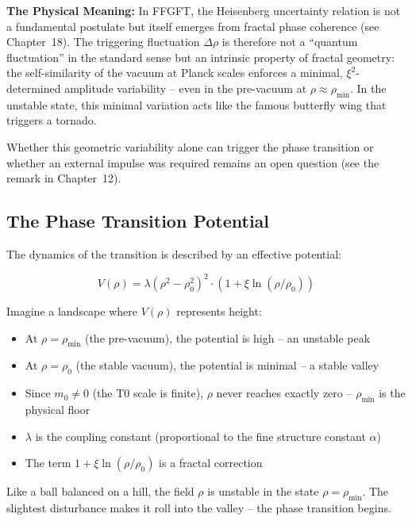 	\textbf{The Physical Meaning:} In FFGFT, the Heisenberg uncertainty relation is not a fundamental postulate but itself emerges from fractal phase coherence (see Chapter~18). The triggering fluctuation $\Delta\rho$ is therefore not a ``quantum fluctuation'' in the standard sense but an intrinsic property of fractal geometry: the self-similarity of the vacuum at Planck scales enforces a minimal, $\xi^2$-determined amplitude variability -- even in the pre-vacuum at $\rho \approx \rho_{\min}$. In the unstable state, this minimal variation acts like the famous butterfly wing that triggers a tornado.
	
	Whether this geometric variability alone can trigger the phase transition or whether an external impulse was required remains an open question (see the remark in Chapter~12).
	
	\subsection{The Phase Transition Potential}
	
	The dynamics of the transition is described by an effective potential:
	
	\begin{equation}
		V(\rho) = \lambda (\rho^2 - \rho_0^2)^2 \cdot \left(1 + \xi \ln(\rho/\rho_0)\right)
	\end{equation}
	
	Imagine a landscape where $V(\rho)$ represents height:
	
	\begin{itemize}[leftmargin=*]
		\item At $\rho = \rho_{\min}$ (the pre-vacuum), the potential is high -- an unstable peak
		\item At $\rho = \rho_0$ (the stable vacuum), the potential is minimal -- a stable valley
		\item Since $m_0 \neq 0$ (the T0 scale is finite), $\rho$ never reaches exactly zero -- $\rho_{\min}$ is the physical floor
		\item $\lambda$ is the coupling constant (proportional to the fine structure constant $\alpha$)
		\item The term $1 + \xi \ln(\rho/\rho_0)$ is a fractal correction
	\end{itemize}
	
	Like a ball balanced on a hill, the field $\rho$ is unstable in the state $\rho = \rho_{\min}$. The slightest disturbance makes it roll into the valley -- the phase transition begins.
	
